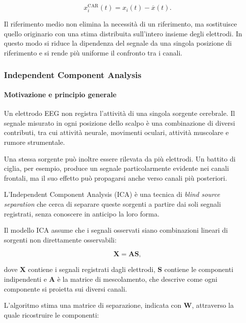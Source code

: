 \begin{equation}
	x_i^{\mathrm{CAR}}(t)
	=
	x_i(t)-\overline{x}(t).
\end{equation}

Il riferimento medio non elimina la necessità di un riferimento, ma
sostituisce quello originario con una stima distribuita sull'intero
insieme degli elettrodi. In questo modo si riduce la dipendenza del
segnale da una singola posizione di riferimento e si rende più
uniforme il confronto tra i canali.

\subsubsection{Independent Component Analysis}

\paragraph{Motivazione e principio generale}

Un elettrodo EEG non registra l'attività di una singola sorgente
cerebrale. Il segnale misurato in ogni posizione dello scalpo è una
combinazione di diversi contributi, tra cui attività neurale,
movimenti oculari, attività muscolare e rumore strumentale.

Una stessa sorgente può inoltre essere rilevata da più elettrodi. Un
battito di ciglia, per esempio, produce un segnale particolarmente
evidente nei canali frontali, ma il suo effetto può propagarsi anche
verso canali più posteriori.

L'Independent Component Analysis (ICA) è una tecnica di
\textit{blind source separation} che cerca di separare queste
sorgenti a partire dai soli segnali registrati, senza conoscere in
anticipo la loro forma.

Il modello ICA assume che i segnali osservati siano combinazioni
lineari di sorgenti non direttamente osservabili:

\begin{equation}
	\mathbf{X}
	=
	\mathbf{A}\mathbf{S},
\end{equation}

dove $\mathbf{X}$ contiene i segnali registrati dagli elettrodi,
$\mathbf{S}$ contiene le componenti indipendenti e $\mathbf{A}$ è
la matrice di mescolamento, che descrive come ogni componente si
proietta sui diversi canali.

L'algoritmo stima una matrice di separazione, indicata con
$\mathbf{W}$, attraverso la quale ricostruire le componenti:

